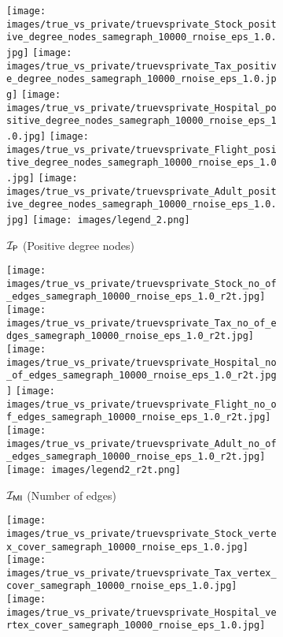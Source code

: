 {\begin{figure*}
    \begin{subfigure}[b]{\textwidth}
    \centering
    \texttt{[image: images/true\_vs\_private/truevsprivate\_Stock\_positive\_degree\_nodes\_samegraph\_10000\_rnoise\_eps\_1.0.jpg]}
    \hfill
    \texttt{[image: images/true\_vs\_private/truevsprivate\_Tax\_positive\_degree\_nodes\_samegraph\_10000\_rnoise\_eps\_1.0.jpg]}
    \hfill
    \texttt{[image: images/true\_vs\_private/truevsprivate\_Hospital\_positive\_degree\_nodes\_samegraph\_10000\_rnoise\_eps\_1.0.jpg]}
    \hfill
    \texttt{[image: images/true\_vs\_private/truevsprivate\_Flight\_positive\_degree\_nodes\_samegraph\_10000\_rnoise\_eps\_1.0.jpg]}
    \hfill
    \texttt{[image: images/true\_vs\_private/truevsprivate\_Adult\_positive\_degree\_nodes\_samegraph\_10000\_rnoise\_eps\_1.0.jpg]}
    \texttt{[image: images/legend\_2.png]}
    \caption{$\mathcal{I_\mathsf{P}}$ (Positive degree nodes)}
    \label{fig:tp_rnoise_pdedges}
    \end{subfigure}
    \begin{subfigure}[b]{\textwidth}
    \centering
    \texttt{[image: images/true\_vs\_private/truevsprivate\_Stock\_no\_of\_edges\_samegraph\_10000\_rnoise\_eps\_1.0\_r2t.jpg]}
    \hfill
    \texttt{[image: images/true\_vs\_private/truevsprivate\_Tax\_no\_of\_edges\_samegraph\_10000\_rnoise\_eps\_1.0\_r2t.jpg]}
    \hfill
    \texttt{[image: images/true\_vs\_private/truevsprivate\_Hospital\_no\_of\_edges\_samegraph\_10000\_rnoise\_eps\_1.0\_r2t.jpg]}
    \hfill
    \texttt{[image: images/true\_vs\_private/truevsprivate\_Flight\_no\_of\_edges\_samegraph\_10000\_rnoise\_eps\_1.0\_r2t.jpg]}
    \hfill
    \texttt{[image: images/true\_vs\_private/truevsprivate\_Adult\_no\_of\_edges\_samegraph\_10000\_rnoise\_eps\_1.0\_r2t.jpg]}
    \texttt{[image: images/legend2\_r2t.png]}
    \caption{$\mathcal{I_{\mathsf{MI}}}$ (Number of edges)}
    \label{fig:tp_rnoise_nedges}
    \end{subfigure}
      \begin{subfigure}[b]{\textwidth}
         \centering
         \texttt{[image: images/true\_vs\_private/truevsprivate\_Stock\_vertex\_cover\_samegraph\_10000\_rnoise\_eps\_1.0.jpg]}
         \hfill
         \texttt{[image: images/true\_vs\_private/truevsprivate\_Tax\_vertex\_cover\_samegraph\_10000\_rnoise\_eps\_1.0.jpg]}
         \hfill
         \texttt{[image: images/true\_vs\_private/truevsprivate\_Hospital\_vertex\_cover\_samegraph\_10000\_rnoise\_eps\_1.0.jpg]}

\end{subfigure}
\end{figure*}}
